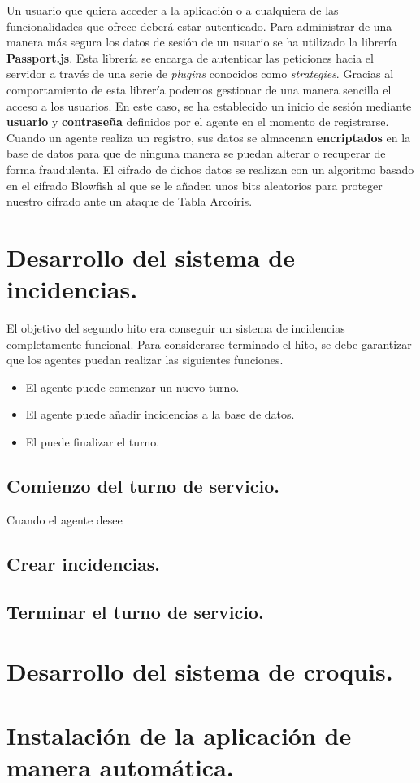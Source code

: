 Un usuario que quiera acceder a la aplicación o a cualquiera de las funcionalidades que ofrece deberá estar autenticado.
Para administrar de una manera más segura los datos de sesión de un usuario se ha utilizado la librería \textbf{Passport.js}\cite{passport}.
Esta librería se encarga de autenticar las peticiones hacia el servidor a través de una serie de \textit{plugins} conocidos
como \textit{strategies}. Gracias al comportamiento de esta librería podemos gestionar de una manera sencilla el acceso a los usuarios.
En este caso, se ha establecido un inicio de sesión mediante \textbf{usuario} y \textbf{contraseña} definidos por el agente en el 
momento de registrarse.\\

Cuando un agente realiza un registro, sus datos se almacenan \textbf{encriptados} en la base de datos para que de ninguna manera
se puedan alterar o recuperar de forma fraudulenta. El cifrado de dichos datos se realizan con un algoritmo basado en el cifrado
Blowfish\cite{blowfish} al que se le añaden unos bits aleatorios para proteger nuestro cifrado ante un ataque de Tabla Arcoíris\cite{rainbow}.


\section{Desarrollo del sistema de incidencias.}

El objetivo del segundo hito era conseguir un sistema de incidencias completamente funcional. Para considerarse terminado el hito, se debe garantizar que los agentes puedan realizar las siguientes funciones.

\begin{itemize}
	\item El agente puede comenzar un nuevo turno.
	\item El agente puede añadir incidencias a la base de datos.
	\item El puede finalizar el turno.
\end{itemize}

\subsection{Comienzo del turno de servicio.}
Cuando el agente desee
\subsection{Crear incidencias.}
\subsection{Terminar el turno de servicio.}


\section{Desarrollo del sistema de croquis.}


\section{Instalación de la aplicación de manera automática.}



